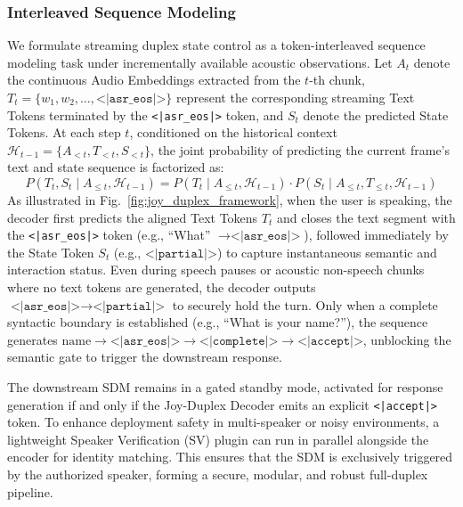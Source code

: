 \subsubsection{Interleaved Sequence Modeling}
We formulate streaming duplex state control as a token-interleaved sequence modeling task under incrementally available acoustic observations. 
Let $A_t$ denote the continuous Audio Embeddings extracted from the $t$-th chunk, $T_t = \{w_1, w_2, \dots, \texttt{<|asr\_eos|>\}}$ represent the corresponding streaming Text Tokens terminated by the \texttt{<|asr\_eos|>} token, and $S_t$ denote the predicted State Tokens. At each step $t$, conditioned on the historical context $\mathcal{H}_{t-1} = \{A_{<t}, T_{<t}, S_{<t}\}$, the joint probability of predicting the current frame's text and state sequence is factorized as:
\begin{equation}
    P(T_t, S_t \mid A_{\le t}, \mathcal{H}_{t-1}) = P(T_t \mid A_{\le t}, \mathcal{H}_{t-1}) \cdot P(S_t \mid A_{\le t}, T_{\le t}, \mathcal{H}_{t-1})
\end{equation}
As illustrated in Fig.~\ref{fig:joy_duplex_framework}, when the user is speaking, the decoder first predicts the aligned Text Tokens $T_t$ and closes the text segment with the \texttt{<|asr\_eos|>} token (e.g., ``What'' $\rightarrow \texttt{<|asr\_eos|>}$), followed immediately by the State Token $S_t$ (e.g., $\texttt{<|partial|>}$) to capture instantaneous semantic and interaction status. Even during speech pauses or acoustic non-speech chunks where no text tokens are generated, the decoder outputs $\texttt{<|asr\_eos|>} \rightarrow \texttt{<|partial|>}$ to securely hold the turn. Only when a complete syntactic boundary is established (e.g., ``What is your name?''), the sequence generates $\text{name} \rightarrow \texttt{<|asr\_eos|>} \rightarrow \texttt{<|complete|>} \rightarrow \texttt{<|accept|>}$, unblocking the semantic gate to trigger the downstream response.

The downstream SDM remains in a gated standby mode, activated for response generation if and only if the Joy-Duplex Decoder emits an explicit \texttt{<|accept|>} token. To enhance deployment safety in multi-speaker or noisy environments, a lightweight Speaker Verification (SV) plugin can run in parallel alongside the encoder for identity matching. This ensures that the SDM is exclusively triggered by the authorized speaker, forming a secure, modular, and robust full-duplex pipeline.

